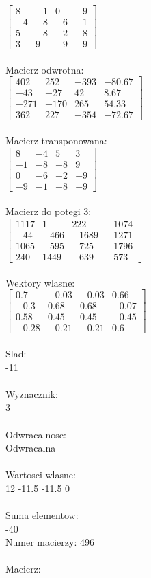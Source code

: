 \documentclass[a4paper,12pt]{article}
\begin{document}
$\begin{bmatrix} 8&-1&0&-9\\-4&-8&-6&-1\\5&-8&-2&-8\\3&9&-9&-9 \end{bmatrix}$
\\
\\
Macierz odwrotna:\\

$\begin{bmatrix} 402&252&-393&-80.67\\-43&-27&42&8.67\\-271&-170&265&54.33\\362&227&-354&-72.67 \end{bmatrix}$
\\
\\
Macierz transponowana:\\

$\begin{bmatrix} 8&-4&5&3\\-1&-8&-8&9\\0&-6&-2&-9\\-9&-1&-8&-9 \end{bmatrix}$
\\
\\
Macierz do potegi 3:\\

$\begin{bmatrix} 1117&1&222&-1074\\-44&-466&-1689&-1271\\1065&-595&-725&-1796\\240&1449&-639&-573 \end{bmatrix}$
\\
\\
Wektory wlasne:\\

$\begin{bmatrix} 0.7&-0.03&-0.03&0.66\\-0.3&0.68&0.68&-0.07\\0.58&0.45&0.45&-0.45\\-0.28&-0.21&-0.21&0.6 \end{bmatrix}$
\\
\\
Slad:\\
-11
\\
\\
Wyznacznik:\\
3
\\
\\
Odwracalnosc:\\
Odwracalna
\\
\\
Wartosci wlasne:\\
12 -11.5 -11.5 0
\\
\\
Suma elementow:\\
-40
\\
\newpage
Numer macierzy:
496
\\
\\
Macierz:\\
\end{document}
